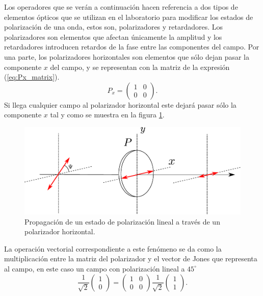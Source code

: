 Los operadores que se verán a
continuación hacen referencia a dos tipos de elementos ópticos que se
utilizan en el laboratorio para modificar los estados de polarización
de una onda, estos son, polarizadores y retardadores. Los polarizadores
son elementos que afectan únicamente la amplitud y los
retardadores introducen retardos de la fase entre las componentes del campo.
Por una parte, los polarizadores horizontales son elementos que sólo
dejan pasar la componente $x$ del campo, y se representan con la
matriz de la expresión (\ref{eq:Px_matrix}).
\begin{equation}
P_x = \begin{pmatrix}1 &0\\0&0\end{pmatrix}.
\label{eq:Px_matrix}
\end{equation}
Si llega cualquier campo al polarizador horizontal este dejará pasar
sólo la componente $x$ tal y
como se muestra en la figura \ref{fig:linear_polarizer}. 
\begin{figure}[h!]
\centering
\includegraphics[scale = .7]{linear_polarizer}
\caption{Propagación de un estado de polarización lineal a través de
  un polarizador horizontal.}
\label{fig:linear_polarizer}
\end{figure}
La  operación vectorial correspondiente a este fenómeno se da como la
multiplicación entre la matriz del polarizador y el vector de Jones
que representa al campo, en este caso un campo con polarización lineal
a $45^{\circ}$
\begin{equation*}
\frac{1}{\sqrt{2}}
\begin{pmatrix}
1\\0
\end{pmatrix}
=
\begin{pmatrix}
1 &0\\0&0
\end{pmatrix}
\frac{1}{\sqrt{2}}
\begin{pmatrix}
1 \\1
\end{pmatrix}.
\end{equation*}
